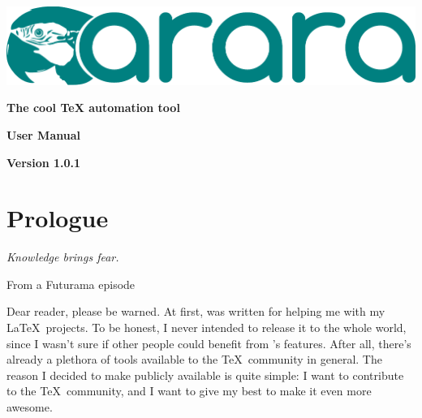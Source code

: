 \documentclass[a4paper,twoside,12pt]{memoir}
\newcommand{\araraversion}{1.0.1}
\begin{document}
\begin{titlingpage}

\begin{center}
\vspace*{3em}

\includegraphics[scale=.7]{araralogo.pdf}

\vspace{2em}

{\color{araracolor}\bfseries\Huge The cool \TeX{} automation tool}

\vspace{15em}

\begin{mdframed}[innertopmargin=10pt,innerbottommargin=10pt,innerleftmargin=10pt,%
                innerrightmargin=10pt,roundcorner=5pt,linecolor=araracolor,%
                middlelinewidth=2pt]
{\color{araracolor}\bfseries\Huge\Forward\hfill User Manual}
\end{mdframed}

\vfill

{\color{araracolor}\bfseries\LARGE Version \araraversion}

\end{center}

\end{titlingpage}

\frontmatter
{}
\pagestyle{araraheadings}

\chapter*{Prologue}
\label{chap:prologue}

\epigraph{\emph{Knowledge brings fear.}}{From a Futurama episode}

Dear reader, please be warned. At first, \arara was written for helping me with
my \LaTeX\ projects. To be honest, I never intended to release it to the whole 
world, since I wasn't sure if other people could benefit from \arara's features.
After all, there's already a plethora of tools available to the \TeX\ community 
in general. The reason I decided to make \arara publicly available is quite 
simple: I want to contribute to the \TeX\ community, and I want to give my best 
to make it even more awesome.
\end{document}
